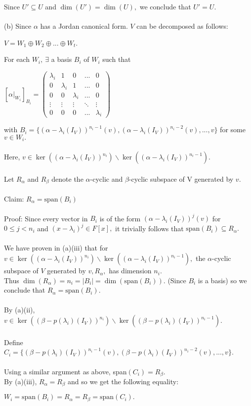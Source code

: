 \documentclass{article}
\begin{document}
Since $U' \subseteq U $ and $\dim(U') = \dim(U),$ we conclude that $U' = U.$\\\\
(b) Since $\alpha$ has a Jordan canonical form.
$V$ can be decomposed as follows:\begin{center}
    $V = W_1 \oplus W_2 \oplus ... \oplus W_t$.
\end{center}
For each $W_i,\ \exists $ a basis $B_i $ of $W_i$ such that\begin{center}
  $[\alpha|_{W_i}]_{B_i} = \begin{pmatrix}
    \lambda_i & 1 & 0 & ... & 0 \\
    0 & \lambda_i & 1 & ... & 0 \\ 0 & 0 & \lambda_i & ... & 0 \\ \vdots & \vdots & \vdots & \ddots & \vdots \\ 0 & 0 & 0 & ... & \lambda_i
\end{pmatrix}$  
\end{center} with $B_i = \{(\alpha - \lambda_i (I_V))^{n_i-1}(v),(\alpha - \lambda_i (I_V))^{n_i-2}(v),...,v\}$ for some $v \in W_i.$\\\\
Here, $v \in \ker((\alpha - \lambda_i (I_V))^{n_i}) \backslash \ker((\alpha - \lambda_i (I_V))^{n_i-1}).$
\\\\
Let $R_\alpha$ and $R_\beta$ denote the $\alpha$-cyclic and $\beta$-cyclic subspace of V generated by $v$.\\\\
Claim: $R_\alpha = \text{span}(B_i)$\\\\
Proof: Since every vector in $B_i$ is of the form $(\alpha-\lambda_i (I_V))^j(v)$ for $0 \leq j < n_i$ and $(x-\lambda_i)^j \in F[x],$ it trivially follows that $\text{span}(B_i) \subseteq R_\alpha.$   \\\\We have proven in (a)(iii) that for $v \in \ker((\alpha - \lambda_i (I_V))^{n_i}) \backslash \ker((\alpha - \lambda_i (I_V))^{n_i-1}),$ the $\alpha$-cyclic subspace of $V$ generated by $v, R_\alpha,$ has dimension $n_i.$\\ Thus $\dim(R_\alpha) = n_i = |B_i| = \dim(\text{span}(B_i)).$ (Since $B_i$ is a basis) so we conclude that $R_\alpha = \text{span}(B_i).$\\\\
By (a)(ii), $v \in \ker((\beta - p(\lambda_i) (I_V))^{n_i}) \backslash \ker((\beta - p(\lambda_i) (I_V))^{n_i-1}).$\\\\ Define $C_i = \{(\beta - p(\lambda_i) (I_V))^{n_i-1}(v),(\beta - p(\lambda_i) (I_V))^{n_i-2}(v),...,v\}$.\\\\ Using a similar argument as above, span$(C_i) = R_\beta.$\\ By (a)(iii), $R_\alpha = R_\beta$ and so we get the following equality:\begin{center}
    $W_i = \text{span}(B_i)= R_\alpha = R_\beta = \text{span}(C_i).$
\end{center}
\end{document}
